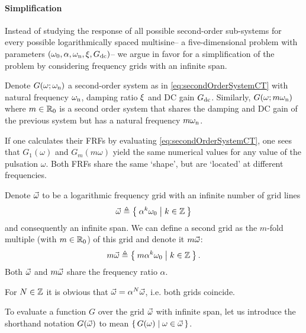   \paragraph{Simplification}
  Instead of studying the response of all possible second-order sub-systems for every possible logarithmically spaced multisine-- a five-dimensional problem with parameters $(\omega_0, \alpha, \omega_{\mathrm{n}}, \xi, G_{\mathrm{dc}})$-- we argue in favor for a simplification of the problem by considering frequency grids with an infinite span.

  Denote $G(\omega; \omega_{\mathrm{n}})$ a second-order system as in \eqref{eq:secondOrderSystemCT} with natural frequency $\omega_{\mathrm{n}}$, damping ratio $\xi$ and \gls{DC} gain $G_{\mathrm{dc}}$.
  Similarly, $G(\omega; m\omega_{\mathrm{n}})$ where $m \in \mathbb{R}_{0}$ is a second order system that shares the damping and \gls{DC} gain of the previous system but has a natural frequency $m\omega_{\mathrm{n}}$.

  If one calculates their FRFs by evaluating \eqref{eq:secondOrderSystemCT}, one sees that $G_1(\omega)$ and $G_m(m\omega)$ yield the same numerical values for any value of the pulsation $\omega$.
  Both FRFs share the same `shape', but are `located' at different frequencies.

  Denote $\vec{\omega}$ to be a logarithmic frequency grid with an infinite number of grid lines
  \begin{equation}
    \vec{\omega} \triangleq \Set{\alpha^k \omega_0 | k \in \ensuremath{\mathbb{Z}}}
    \label{eq:freqGridLog}
  \end{equation}
  and consequently an infinite span.
  We can define a second grid as the $m$-fold multiple (with $m \in \mathbb{R}_{0}$) of this grid and denote it $m\vec{\omega}$:
  \begin{equation}
    m \vec{\omega} \triangleq \Set{m \alpha^k \omega_0 | k \in \ensuremath{\mathbb{Z}}}
    \text{.}
  \end{equation}
  Both $\vec{\omega}$ and $m\vec{\omega}$ share the frequency ratio $\alpha$.
  \begin{remark} \label{rem:exc:gridscaling}
    For $N \in \mathbb{Z}$ it is obvious that $\vec{\omega} = \alpha^{N} \vec{\omega}$, i.e. both grids coincide.
  \end{remark}

  \begin{definition}
  To evaluate a function $G$ over the grid $\vec{\omega}$ with infinite span, let us introduce the shorthand notation $G(\vec{\omega})$ to mean $\set{G(\omega) | \omega \in \ensuremath{\vec{\omega}}}$.
  \end{definition}

